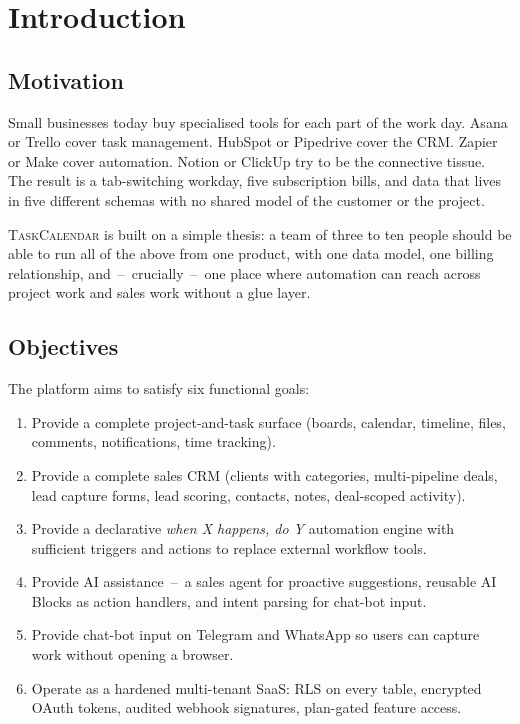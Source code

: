 \documentclass[11pt,a4paper,oneside]{article}
\newcommand{\tc}{\textsc{TaskCalendar}}
\newcommand{\dash}{\,--\,}
\begin{document}
\section{Introduction}\label{sec:intro}

\subsection{Motivation}

Small businesses today buy specialised tools for each part of the
work day. Asana or Trello cover task management. HubSpot or Pipedrive
cover the CRM. Zapier or Make cover automation. Notion or ClickUp try
to be the connective tissue. The result is a tab-switching workday,
five subscription bills, and data that lives in five different
schemas with no shared model of the customer or the project.

\tc{} is built on a simple thesis: a team of three to ten people
should be able to run all of the above from one product, with one
data model, one billing relationship, and \dash{} crucially \dash{}
one place where automation can reach across project work and sales
work without a glue layer.

\subsection{Objectives}

The platform aims to satisfy six functional goals:

\begin{enumerate}
  \item Provide a complete project-and-task surface (boards, calendar,
    timeline, files, comments, notifications, time tracking).
  \item Provide a complete sales CRM (clients with categories,
    multi-pipeline deals, lead capture forms, lead scoring, contacts,
    notes, deal-scoped activity).
  \item Provide a declarative \emph{when X happens, do Y} automation
    engine with sufficient triggers and actions to replace external
    workflow tools.
  \item Provide AI assistance \dash{} a sales agent for proactive
    suggestions, reusable AI Blocks as action handlers, and intent
    parsing for chat-bot input.
  \item Provide chat-bot input on Telegram and WhatsApp so users can
    capture work without opening a browser.
  \item Operate as a hardened multi-tenant SaaS: RLS on every table,
    encrypted OAuth tokens, audited webhook signatures, plan-gated
    feature access.
\end{enumerate}
\end{document}
